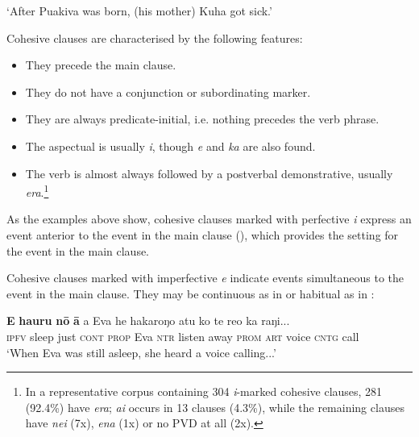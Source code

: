 \glt
‘After Puakiva was born, (his mother) Kuha got sick.’ \textstyleExampleref{[R229.001]} 
\z

Cohesive clauses are characterised by the following features:

\begin{itemize}
\item 
They precede the main clause.

\item 
They do not have a conjunction or subordinating marker.

\item 
They are always predicate-initial, i.e. nothing precedes the verb phrase.

\item 
The aspectual is usually \textit{i}, though \textit{e} and \textit{ka} are also found.

\item 
The verb is almost always followed by a postverbal demonstrative, usually \textit{era}.\footnote{\label{fn:529}In a representative corpus containing 304 \textit{i}{}-marked cohesive clauses, 281 (92.4\%) have \textit{era}; \textit{ai} occurs in 13 clauses (4.3\%), while the remaining clauses have \textit{nei} (7x), \textit{ena} (1x) or no PVD at all (2x).} 

\end{itemize}

As the examples above show, cohesive clauses marked with perfective \textit{i} express an event anterior to the event in the main clause (), which provides the setting for the event in the main clause.

Cohesive clauses marked with imperfective \textit{e} indicate events simultaneous to the event in the main clause. They may be continuous as in  or habitual as in :

\ea\label{ex:11.213}
\gll \textbf{E} \textbf{ha{\ꞌ}uru} \textbf{nō} \textbf{{\ꞌ}ā} a Eva he hakaroŋo atu ko te re{\ꞌ}o ka raŋi... \\
\textsc{ipfv} sleep just \textsc{cont} \textsc{prop} Eva \textsc{ntr} listen away \textsc{prom} \textsc{art} voice \textsc{cntg} call \\

\glt 
‘When Eva was still asleep, she heard a voice calling...’ \textstyleExampleref{[R210.080]} 
\z

